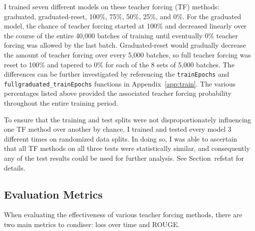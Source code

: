 I trained seven different models on these teacher forcing (TF) methods: graduated, graduated-reset, 100\%, 75\%, 50\%, 25\%, and 0\%. For the graduated model, the chance of teacher forcing started at 100\% and decreased linearly over the course of the entire 40,000 batches of training until eventually 0\% teacher forcing was allowed by the last batch. Graduated-reset would gradually decrease the amount of teacher forcing over every 5,000 batches, so full teacher forcing was reset to 100\% and tapered to 0\% for each of the 8 sets of 5,000 batches. The differences can be further investigated by referencing the \texttt{trainEpochs} and \texttt{fullgraduated\_trainEpochs} functions in Appendix~\ref{app:train}. The various percentages listed above provided the associated teacher forcing probability throughout the entire training period.

To ensure that the training and test splits were not disproportionately influencing one TF method over another by chance, I trained and tested every model 3 different times on randomized data splits. In doing so, I was able to ascertain that all TF methods on all three tests were statistically similar, and consequently any of the test results could be used for further analysis. See Section~ref{stat} for details.

\subsection{Evaluation Metrics}
When evaluating the effectiveness of various teacher forcing methods, there are two main metrics to condiser: loss over time and ROUGE.

